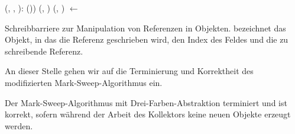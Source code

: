 \begin{algorithm}[h]
\begin{algorithmic}[1]
	\State \Atomic {}(, , ):
	\State \quad \IF {}())
	\State \quad \quad {}(, )
	\State \quad \quad {}(, )
	\State \quad {} $\gets$ 
\end{algorithmic}
\caption[Schreibbarriere zur Manipulation von Referenzen]{Schreibbarriere zur Manipulation von Referenzen in Objekten.  bezeichnet das Objekt, in das die Referenz geschrieben wird,  den Index des Feldes und  die zu schreibende Referenz.}
\label{algo:tricolor-barrier}
\end{algorithm}

An dieser Stelle gehen wir auf die Terminierung und Korrektheit des modifizierten Mark-Sweep-Algorithmus ein.

\begin{mybox}
\begin{satz}
	\label{satz:tricolor-correctness}
	Der Mark-Sweep-Algorithmus mit Drei-Farben-Abstraktion terminiert und ist korrekt, sofern während der Arbeit des Kollektors keine neuen Objekte erzeugt werden.
\end{satz}
\end{mybox}

